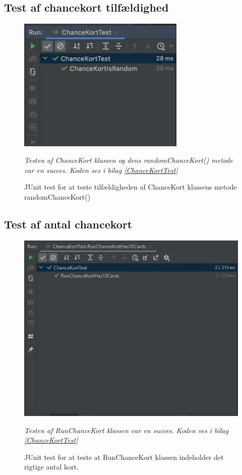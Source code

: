 \subsection{Test af chancekort tilfældighed}
    \begin{figure}[H]
        \centering
        \includegraphics[width=8cm]{figures/chanceKortIsRandom.png}
        \caption{JUnit test for at teste tilfældigheden af ChanceKort klassens metode randomChanceKort()}
        \emph{Testen af ChanceKort klassen og dens randomChanceKort() metode var en succes. Koden ses i bilag \ref{ChanceKortTest}}
    \end{figure}
    
    
    \subsection{Test af antal chancekort}
    \begin{figure}[H]
        \centering
        \includegraphics[width=15cm]{figures/RunChanceKortHas10Cards.JPG}
        \caption{JUnit test for at teste at RunChanceKort klassen indeholder det rigtige antal kort.}
        \emph{Testen af RunChanceKort klassen var en succes. Koden ses i bilag \ref{ChanceKortTest}}
    \end{figure}






